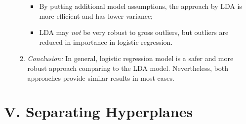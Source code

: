 \documentclass[12pt]{article}
\begin{document}
\begin{enumerate}[label=\textbf{\arabic*.}]
\begin{enumerate}
\begin{itemize}
		\item By putting additional model assumptions, the approach by LDA is more efficient and has lower variance; 

		\item LDA may \emph{not} be very robust to gross outliers, but outliers are reduced in importance in logistic regression. 
		\end{itemize}
		
		\item \textit{Conclusion:} In general, logistic regression model is a safer and more robust approach comparing to the LDA model. Nevertheless, both approaches provide similar results in most cases. 
	\end{enumerate}
\end{enumerate}


\section*{V. Separating Hyperplanes}
\end{document}
